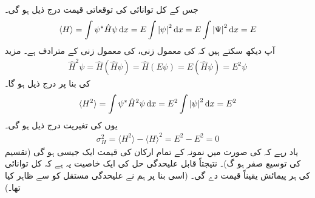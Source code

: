 جس کے کل توانائی کی توقعاتی قیمت درج ذیل ہو گی۔ 
\begin{align}
\langle H \rangle = \int \psi^{*} \hat{H}\psi \dif x = E \int \left| \psi \right|^{2} \dif x = E \int \left| \Psi \right|^{2} \dif x = E
\end{align}
آپ دیکھ سکتے ہیں کہ  کی معمول زنی،    کی معمول زنی کے مترادف ہے۔ مزید
\begin{align*}
\hat{H}^{2} \psi = \hat{H} (\hat{H}\psi ) = \hat{H} ( E\psi ) = E (\hat{H} \psi ) = E^{2} \psi 
\end{align*}
کی بنا پر درج ذیل ہو گا۔
\begin{align*}
\langle H^{2} \rangle = \int \psi^{*} \hat{H}^{2} \psi \dif x = E^{2} \int \left| \psi \right|^{2} \dif x = E^{2}
\end{align*}
یوں کی تغیریت درج ذیل ہو گی۔ 
\begin{align}
\sigma^{2}_{H} = \langle H^{2} \rangle - \langle H \rangle^{2} =E^{2} - E^{2} = 0
\end{align}
یاد رہے کہ  کی صورت میں نمونہ کے  تمام ارکان کی قیمت ایک  جیسی   ہو گی (تقسیم کی توسیع  صفر ہو گ)۔ نتیجتاً قابل علیحدگی حل کی ایک خاصیت یہ ہے کہ کل توانائی کی ہر پیمائش یقیناً  قیمت   دے گی۔ (اسی    بنا پر ہم نے   علیحدگی مستقل کو  سے ظاہر کیا تھا۔) 

